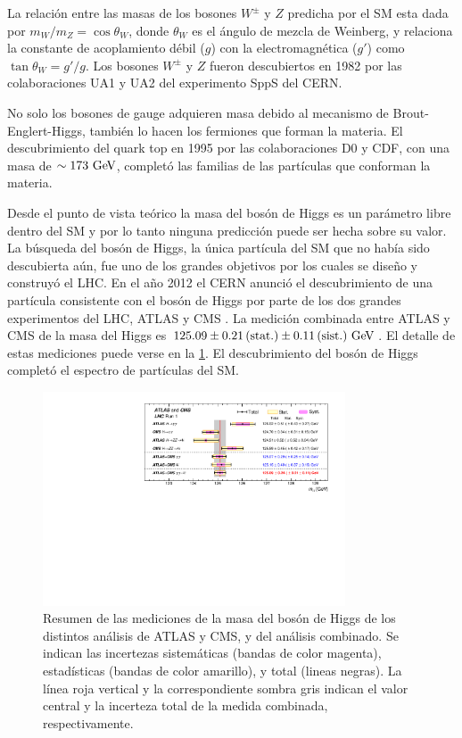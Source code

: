 La relación entre las masas de los bosones $W^\pm$ y $Z$ predicha por el SM esta
dada por $m_W/m_Z = \cos \theta_W$, donde $\theta_W$ es el ángulo de
mezcla de Weinberg, y relaciona la constante de acoplamiento débil ($g$) con la
electromagnética ($g'$) como $\tan\theta_W = g'/g$. Los bosones $W^\pm$ y $Z$
fueron descubiertos en 1982 por las colaboraciones UA1 y UA2 del experimento
SppS del CERN.

No solo los bosones de gauge adquieren masa debido al mecanismo de Brout-Englert-Higgs,
también lo hacen los fermiones que forman la materia. El descubrimiento del
quark top en 1995 por las colaboraciones D0 y CDF, con una masa de $\sim 173
\GeV$, completó las familias de las partículas que conforman la materia.

Desde el punto de vista teórico la masa del bosón de Higgs es un parámetro libre
dentro del SM y por lo tanto ninguna predicción puede ser hecha sobre su valor. La búsqueda
del bosón de Higgs, la única partícula del SM que no había sido descubierta
aún, fue uno de los grandes objetivos por los cuales se dise\~no y construyó el
LHC. En el a\~no 2012 el CERN anunció el
descubrimiento de una partícula consistente con el bosón de Higgs por parte de
los dos grandes experimentos del LHC, ATLAS y CMS
\cite{Aad:2012tfa,Chatrchyan:2012ufa}. La medición combinada entre ATLAS y CMS
de la masa del Higgs es $125.09 \pm 0.21\, \text{(stat.)} \pm 0.11\, \text{(sist.)}
\gev$\cite{HiggsMass_ATLAS_CMS}. %
El detalle de estas mediciones  puede verse en la \cref{fig:higgs_cms_atlas}.
El descubrimiento del bosón de Higgs completó el espectro de partículas del SM.

\begin{figure}[!htbp]
  \centering
  \includegraphics[width=0.8\textwidth]{figures/higgs_atlas_cms_mass}
  \caption{Resumen de las mediciones de la masa del bosón de Higgs de los
    distintos análisis de ATLAS y CMS, y del análisis combinado. Se indican las
    incertezas sistemáticas (bandas de color magenta), estadísticas (bandas de
    color amarillo), y total (lineas negras). La línea roja vertical y la
    correspondiente sombra gris indican el valor central y la incerteza total de
    la medida combinada, respectivamente\cite{HiggsMass_ATLAS_CMS}.}
  \label{fig:higgs_cms_atlas}
\end{figure}



